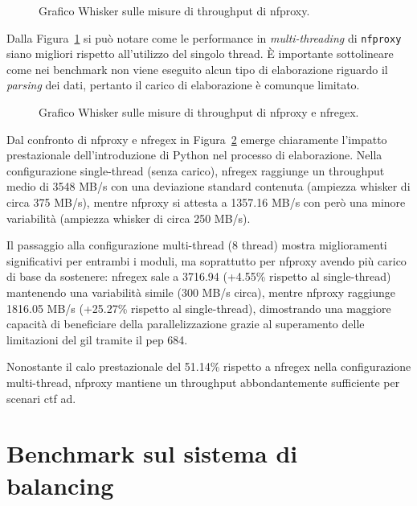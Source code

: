 \begin{figure}[H]
    \centering
    
    \caption{Grafico Whisker sulle misure di throughput di nfproxy.}\label{fig:wisker_nfproxy}
\end{figure}

Dalla Figura~\ref{fig:wisker_nfproxy} si può notare come le performance in \textit{multi-threading} di \texttt{\gls{nfproxy}} siano migliori rispetto all'utilizzo del singolo thread. È importante sottolineare come nei benchmark non viene eseguito alcun tipo di elaborazione riguardo il \textit{parsing} dei dati, pertanto il carico di elaborazione è comunque limitato.

\begin{figure}[H]
    \centering
    
    \caption{Grafico Whisker sulle misure di throughput di nfproxy e nfregex.}\label{fig:wisker_nfproxy_nfregex}
\end{figure}

Dal confronto di \gls{nfproxy} e \gls{nfregex} in Figura~\ref{fig:wisker_nfproxy_nfregex} emerge chiaramente l'impatto prestazionale dell'introduzione di Python nel processo di elaborazione. Nella configurazione single-thread (senza carico), \gls{nfregex} raggiunge un throughput medio di 3548 MB/s con una deviazione standard contenuta (ampiezza whisker di circa 375 MB/s), mentre \gls{nfproxy} si attesta a 1357.16 MB/s con però una minore variabilità (ampiezza whisker di circa 250 MB/s).

Il passaggio alla configurazione multi-thread (8 thread) mostra miglioramenti significativi per entrambi i moduli, ma soprattutto per \gls{nfproxy} avendo più carico di base da sostenere: \gls{nfregex} sale a 3716.94 (+4.55\% rispetto al single-thread) mantenendo una variabilità simile (300 MB/s circa), mentre \gls{nfproxy} raggiunge 1816.05 MB/s (+25.27\% rispetto al single-thread), dimostrando una maggiore capacità di beneficiare della parallelizzazione grazie al superamento delle limitazioni del \gls{gil} tramite il \gls{pep} 684.

Nonostante il calo prestazionale del 51.14\% rispetto a \gls{nfregex} nella configurazione multi-thread, \gls{nfproxy} mantiene un throughput abbondantemente sufficiente per scenari \gls{ctf} \gls{ad}.

\section{Benchmark sul sistema di balancing}\label{balancing_benchmark}

